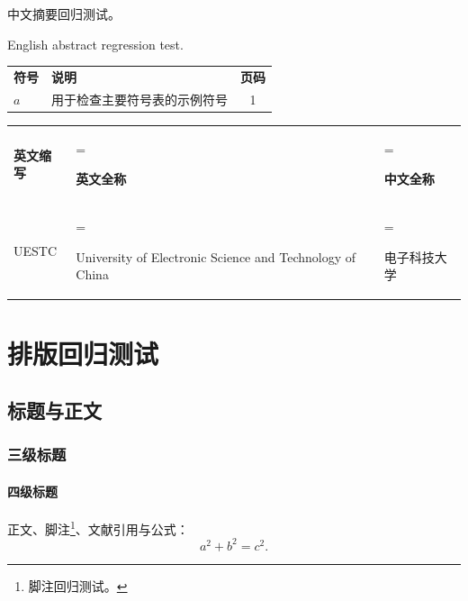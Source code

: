 \documentclass[tocdepth3]{uestcthesis}
\begin{document}
\uestcfrontmatter

\zhabstract
中文摘要回归测试。

\enabstract
English abstract regression test.

\uestctableofcontents
\uestclistoffigures
\uestclistoftables
\uestcsymbols
\begingroup
\renewcommand{\arraystretch}{1.3}
\setlength{\tabcolsep}{9pt}
\noindent
\begin{tabularx}{\linewidth}{l>{\raggedright\arraybackslash}Xc}
    \textbf{符号} & \textbf{说明} & \textbf{页码} \\
    $a$ & 用于检查主要符号表的示例符号 & 1 \\
\end{tabularx}
\endgroup
\uestcacronyms
\begingroup
\renewcommand{\arraystretch}{1.3}
\setlength{\tabcolsep}{9pt}
\noindent
\begin{tabularx}{\linewidth}{%
    l
    >{\hsize=1.2\hsize\linewidth=\hsize\raggedright\arraybackslash}X
    >{\hsize=0.8\hsize\linewidth=\hsize\raggedright\arraybackslash}X}
    \textbf{英文缩写} & \textbf{英文全称} & \textbf{中文全称} \\
    UESTC & University of Electronic Science and Technology of China & 电子科技大学 \\
\end{tabularx}
\endgroup

\uestcmainmatter

\chapter{排版回归测试}
\section{标题与正文}
\subsection{三级标题}
\subsubsection{四级标题}

正文、脚注\footnote{脚注回归测试。}、文献引用\cite{lamport1994latex}与公式：
\begin{equation}
    a^2+b^2=c^2.
\end{equation}
\end{document}
